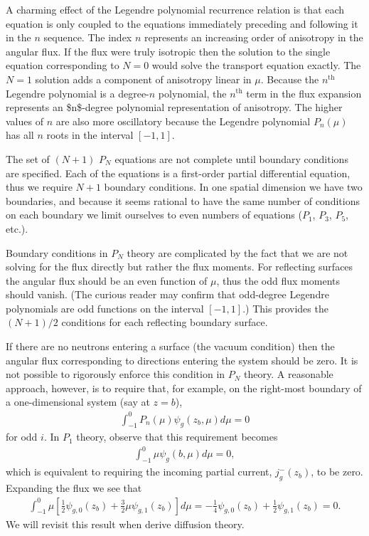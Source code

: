 \documentclass[11pt]{article}
\begin{document}
A charming effect of the Legendre polynomial recurrence relation is that each equation is only coupled to the equations immediately preceding and following it in the \(n\) sequence.  The index \(n\) represents an increasing order of anisotropy in the angular flux.  If the flux were truly isotropic then the solution to the single equation corresponding to \(N=0\) would solve the transport equation exactly.  The \(N=1\) solution adds a component of anisotropy linear in \(\mu\).  Because the \(n^\text{th}\) Legendre polynomial is a degree-\(n\) polynomial, the \(n^\text{th}\) term in the flux expansion represents an \$n\$-degree polynomial representation of anisotropy.  The higher values of \(n\) are also more oscillatory because the Legendre polynomial \(P_n(\mu)\) has all \(n\) roots in the interval \([-1,1]\).

The set of \((N+1)\) \(P_N\) equations are not complete until boundary conditions are specified.  Each of the equations is a first-order partial differential equation, thus we require \(N+1\) boundary conditions.  In one spatial dimension we have two boundaries, and because it seems rational to have the same number of conditions on each boundary we limit ourselves to even numbers of equations (\(P_1\), \(P_3\), \(P_5\), etc.).

Boundary conditions in \(P_N\) theory are complicated by the fact that we are not solving for the flux directly but rather the flux moments.  For reflecting surfaces the angular flux should be an even function of \(\mu\), thus the odd flux moments should vanish.  (The curious reader may confirm that odd-degree Legendre polynomials are odd functions on the interval \([-1,1]\).)  This provides the \((N+1)/2\) conditions for each reflecting boundary surface.

If there are no neutrons entering a surface (the vacuum condition) then the angular flux corresponding to directions entering the system should be zero.  It is not possible to rigorously enforce this condition in \(P_N\) theory.  A reasonable approach, however, is to require that, for example, on the right-most boundary of a one-dimensional system (say at \(z=b\)),
\begin{align}
  \int_{-1}^0 P_n(\mu) \psi_g(z_b,\mu) d\mu = 0
\end{align}
for odd \(i\).  In \(P_1\) theory, observe that this requirement becomes
\begin{align}
  \int_{-1}^0 \mu \psi_g(b,\mu) d\mu = 0,
\end{align}
which is equivalent to requiring the incoming partial current, \(j_g^-(z_b)\), to be zero.  Expanding the flux we see that
\begin{align}
  \int_{-1}^0 \mu \left[ \frac{1}{2} \psi_{g,0}(z_b) + \frac{3}{2} \mu \psi_{g,1}(z_b) \right] d\mu
  = -\frac{1}{4} \psi_{g,0}(z_b) + \frac{1}{2} \psi_{g,1}(z_b) = 0.
\end{align}
We will revisit this result when derive diffusion theory.
\end{document}
